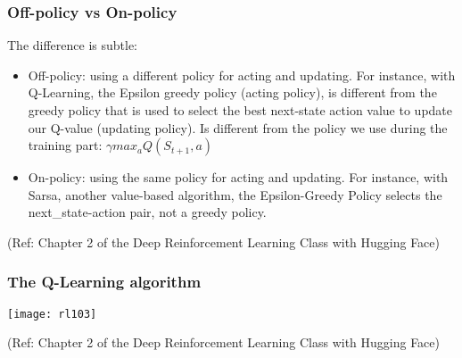 \begin{frame}[fragile]\frametitle{Off-policy vs On-policy}

The difference is subtle:

\begin{itemize}
\item Off-policy: using a different policy for acting and updating. For instance, with Q-Learning, the Epsilon greedy policy (acting policy), is different from the greedy policy that is used to select the best next-state action value to update our Q-value (updating policy). Is different from the policy we use during the training part: $\gamma max_a Q(S_{t+1},a)$

\item On-policy: using the same policy for acting and updating. For instance, with Sarsa, another value-based algorithm, the Epsilon-Greedy Policy selects the next\_state-action pair, not a greedy policy.

\end{itemize}


{\tiny (Ref: Chapter 2 of the Deep Reinforcement Learning Class with Hugging Face)}

\end{frame}

\begin{frame}[fragile]\frametitle{The Q-Learning algorithm}


\begin{center}
\texttt{[image: rl103]}
\end{center}

{\tiny (Ref: Chapter 2 of the Deep Reinforcement Learning Class with Hugging Face)}

\end{frame}

